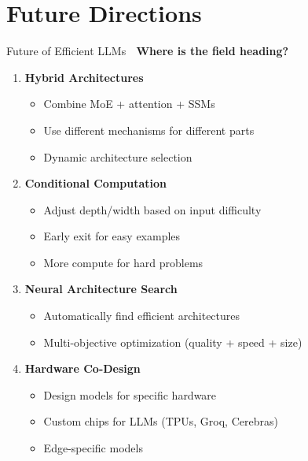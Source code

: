\documentclass[aspectratio=169]{beamer}
\begin{document}
\section{Future Directions}

\begin{frame}[shrink=10]{Future of Efficient LLMs 🔮}
\textbf{Where is the field heading?}

\vspace{0.5em}

\begin{enumerate}\setlength{\itemsep}{0pt}
    \item \textbf{Hybrid Architectures}
    \begin{itemize}\setlength{\itemsep}{0pt}
        \item Combine MoE + attention + SSMs
        \item Use different mechanisms for different parts
        \item Dynamic architecture selection
    \end{itemize}

    \item \textbf{Conditional Computation}
    \begin{itemize}\setlength{\itemsep}{0pt}
        \item Adjust depth/width based on input difficulty
        \item Early exit for easy examples
        \item More compute for hard problems
    \end{itemize}

    \item \textbf{Neural Architecture Search}
    \begin{itemize}\setlength{\itemsep}{0pt}
        \item Automatically find efficient architectures
        \item Multi-objective optimization (quality + speed + size)
    \end{itemize}

    \item \textbf{Hardware Co-Design}
    \begin{itemize}\setlength{\itemsep}{0pt}
        \item Design models for specific hardware
        \item Custom chips for LLMs (TPUs, Groq, Cerebras)
        \item Edge-specific models
    \end{itemize}
\end{enumerate}
\end{frame}
\end{document}
